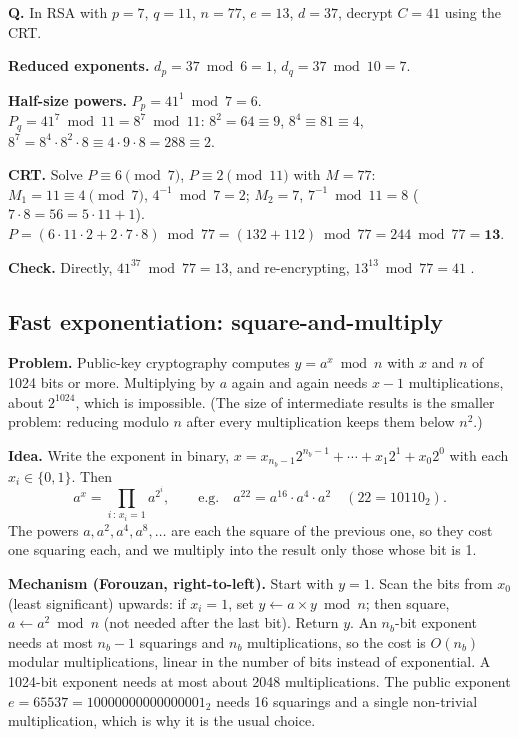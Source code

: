 \begin{worked}
\textbf{Q.} In RSA with $p = 7$, $q = 11$, $n = 77$, $e = 13$, $d = 37$, decrypt $C = 41$ using the CRT.

\textbf{Reduced exponents.} $d_p = 37 \bmod 6 = 1$, \;$d_q = 37 \bmod 10 = 7$.

\textbf{Half-size powers.} $P_p = 41^{1} \bmod 7 = 6$.\\
$P_q = 41^{7} \bmod 11 = 8^7 \bmod 11$: $8^2 = 64 \equiv 9$, $8^4 \equiv 81 \equiv 4$, $8^7 = 8^4 \cdot 8^2 \cdot 8 \equiv 4 \cdot 9 \cdot 8 = 288 \equiv 2$.

\textbf{CRT.} Solve $P \equiv 6 \pmod 7$, $P \equiv 2 \pmod{11}$ with $M = 77$:\\
$M_1 = 11 \equiv 4 \pmod 7$, $4^{-1} \bmod 7 = 2$; \;$M_2 = 7$, $7^{-1} \bmod 11 = 8$ ($7 \cdot 8 = 56 = 5 \cdot 11 + 1$).\\
$P = (6 \cdot 11 \cdot 2 + 2 \cdot 7 \cdot 8) \bmod 77 = (132 + 112) \bmod 77 = 244 \bmod 77 = \mathbf{13}$.

\textbf{Check.} Directly, $41^{37} \bmod 77 = 13$, and re-encrypting, $13^{13} \bmod 77 = 41$ \checkmark.
\end{worked}

\subsection{Fast exponentiation: square-and-multiply \hot}
\textbf{Problem.} Public-key cryptography computes $y = a^x \bmod n$ with $x$ and $n$ of 1024 bits or more. Multiplying by $a$ again and again needs $x - 1$ multiplications, about $2^{1024}$, which is impossible. (The size of intermediate results is the smaller problem: reducing modulo $n$ after every multiplication keeps them below $n^2$.)

\textbf{Idea.} Write the exponent in binary, $x = x_{n_b - 1} 2^{n_b - 1} + \cdots + x_1 2^1 + x_0 2^0$ with each $x_i \in \{0, 1\}$. Then
\[
a^x = \prod_{i \,:\, x_i = 1} a^{2^i}, \qquad\text{e.g.}\quad a^{22} = a^{16} \cdot a^{4} \cdot a^{2} \quad (22 = 10110_2).
\]
The powers $a, a^2, a^4, a^8, \dots$ are each the square of the previous one, so they cost one squaring each, and we multiply into the result only those whose bit is 1.

\textbf{Mechanism (Forouzan, right-to-left).} Start with $y = 1$. Scan the bits from $x_0$ (least significant) upwards: if $x_i = 1$, set $y \leftarrow a \times y \bmod n$; then square, $a \leftarrow a^2 \bmod n$ (not needed after the last bit). Return $y$. An $n_b$-bit exponent needs at most $n_b - 1$ squarings and $n_b$ multiplications, so the cost is $O(n_b)$ modular multiplications, linear in the number of bits instead of exponential. A 1024-bit exponent needs at most about 2048 multiplications. The public exponent $e = 65537 = 10000000000000001_2$ needs 16 squarings and a single non-trivial multiplication, which is why it is the usual choice.

